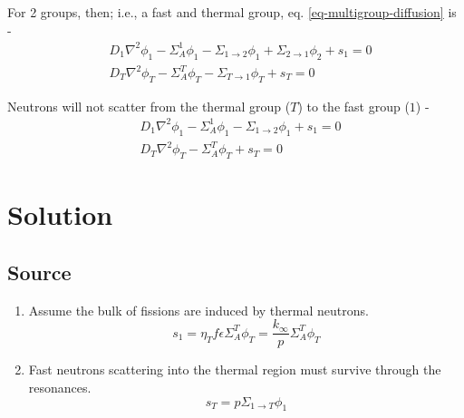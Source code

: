 \documentclass[11pt,a4paper]{article}
\begin{document}
\noindent For 2 groups, then; i.e., a fast and thermal group, eq. \ref{eq-multigroup-diffusion} is - 
\begin{equation}
    \begin{split}
        & D_1\nabla^2{\phi_1}-\Sigma_A^1\phi_1-\Sigma_{1 \rightarrow 2}\phi_1+\Sigma_{2 \rightarrow 1}\phi_2+s_1=0 \\
        & D_T\nabla^2{\phi_T}-\Sigma_A^T\phi_T-\Sigma_{T \rightarrow 1}\phi_T+s_T=0
    \end{split}
\end{equation}

\noindent Neutrons will not scatter from the thermal group ($T$) to the fast group ($1$) - 
\begin{equation}
    \begin{split} \label{eq-general-reactor}
        & D_1\nabla^2{\phi_1}-\Sigma_A^1\phi_1-\Sigma_{1 \rightarrow 2}\phi_1+s_1=0 \\
        & D_T\nabla^2{\phi_T}-\Sigma_A^T\phi_T+s_T=0
    \end{split}
\end{equation}

\section{Solution}
\subsection{Source}
\begin{enumerate}[leftmargin=*,topsep=0pt]
    \item Assume the bulk of fissions are induced by thermal neutrons.
        \begin{equation} \label{eq-fast-source}
            s_1=\eta_T f \epsilon \Sigma_A^T \phi_T = \frac{k_{\infty}}{p} \Sigma_A^T \phi_T
        \end{equation}
    \item Fast neutrons scattering into the thermal region must survive through the resonances. 
        \begin{equation} \label{eq-thermal-source}
            s_T=p\Sigma_{1 \rightarrow T}\phi_1
        \end{equation}
\end{enumerate}
\end{document}

